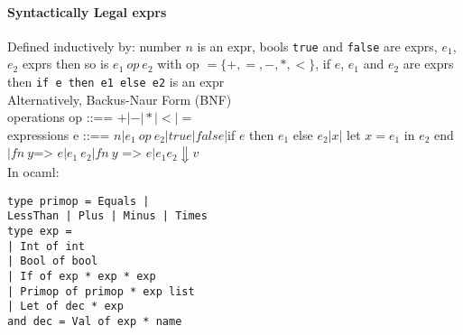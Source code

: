 \paragraph{Syntactically Legal exprs}
Defined inductively by: number $n$ is an expr, bools \texttt{true} and
\texttt{false} are exprs, $e_1$, $e_2$ exprs then so is $e_1 \ op \
e_2$ with op $=\{+,=,-,*,<\}$, if $e$, $e_1$ and $e_2$ are exprs then
\texttt{if e then e1 else e2} is an expr
\\ Alternatively, Backus-Naur Form (BNF)
\\ operations op ::== $+|-|*|<|=$
\\ expressions e ::== $n | e_1 \ op \ e_2 | true | false | $if $e$ then
$e_1$ else $e_2 | x |$ let $x = e_1$ in $e_2$ end  $|fn\ y $=> $e |
e_1 \ e_2 | fn \ y$ => $e | e_1 e_2 \Downarrow v$
\\ In ocaml:
\begin{lstlisting}
type primop = Equals | 
LessThan | Plus | Minus | Times
type exp =
| Int of int
| Bool of bool
| If of exp * exp * exp
| Primop of primop * exp list
| Let of dec * exp
and dec = Val of exp * name
\end{lstlisting}
\vspace{-1 em}
